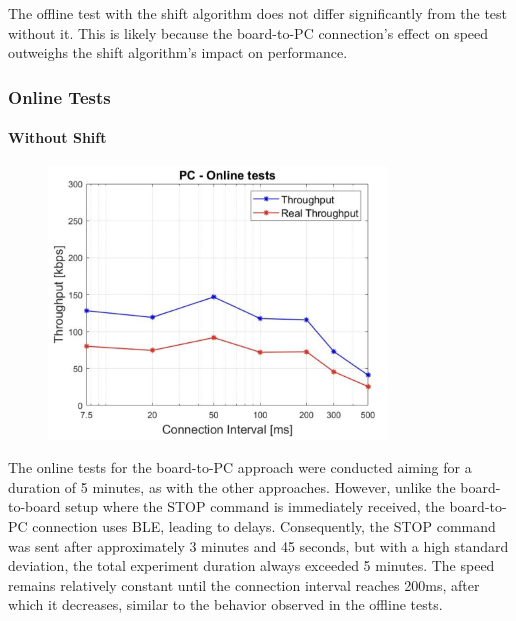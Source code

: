 \documentclass{Configuration_Files/PoliMi3i_thesis}
\begin{document}
The offline test with the shift algorithm does not differ significantly from the test without it. This is likely because the board-to-PC connection's effect on speed outweighs the shift algorithm's impact on performance.

\subsubsection*{Online Tests}

\paragraph{Without Shift}

\begin{figure}[H]
    \centering
    \includegraphics[width=0.8\textwidth]{Results Manuel/figure35}
    \label{fig:figure1}
\end{figure}

The online tests for the board-to-PC approach were conducted aiming for a duration of 5 minutes, as with the other approaches. However, unlike the board-to-board setup where the STOP command is immediately received, the board-to-PC connection uses BLE, leading to delays. Consequently, the STOP command was sent after approximately 3 minutes and 45 seconds, but with a high standard deviation, the total experiment duration always exceeded 5 minutes. The speed remains relatively constant until the connection interval reaches 200ms, after which it decreases, similar to the behavior observed in the offline tests.
\end{document}
